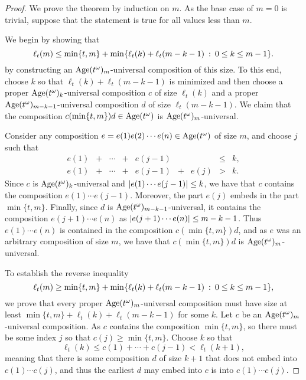\begin{proof}
	We prove the theorem by induction on $m$. As the base case of $m = 0$ is trivial, suppose that the statement is true for all values less than $m$. 
	
	We begin by showing that
	\[
		\ell_t(m) 
		\le
		\min\{t, m\} + \min\{\ell_t(k) + \ell_t(m-k-1) \::\: 0 \le k \le m-1\}.
	\]
	by constructing an $\operatorname{Age}(t^\omega)_m$-universal composition of this size. To this end, choose $k$ so that $\ell_t(k) + \ell_t(m-k-1)$ is minimized and then choose a proper $\operatorname{Age}(t^\omega)_k$-universal composition $c$ of size $\ell_t(k)$ and a proper $\operatorname{Age}(t^\omega)_{m-k-1}$-universal composition $d$ of size $\ell_t(m-k-1)$. We claim that the composition $c (\min\{t, m\}) d \in \operatorname{Age}(t^\omega)$ is $\operatorname{Age}(t^\omega)_m$-universal.

	Consider any composition $e = e(1) e(2) \cdots e(n) \in \operatorname{Age}(t^\omega)$ of size $m$, and choose $j$ such that
	\[
		\begin{array}{lccclclcl}
			e(1) &+& \cdots &+& e(j-1) & &      &\le& k,\\
			e(1) &+& \cdots &+& e(j-1) &+& e(j) & > & k.
		\end{array}
	\]
	Since $c$ is $\operatorname{Age}(t^\omega)_k$-universal and $\left\lvert{e(1) \cdots e(j-1)}\right\rvert \le k$, we have that $c$ contains the composition $e(1) \cdots e(j-1)$. Moreover, the part $e(j)$ embeds in the part $\min\{t, m\}$. Finally, since $d$ is $\operatorname{Age}(t^\omega)_{m-k-1}$-universal, it contains the composition $e(j+1) \cdots e(n)$ as $\left\lvert{e(j+1)\cdots e(n)}\right\rvert \le m-k-1$. Thus $e(1) \cdots e(n)$ is contained in the composition $c (\min\{t, m\}) d$, and as $e$ was an arbitrary composition of size $m$, we have that $c (\min\{t, m\}) d$ is $\operatorname{Age}(t^\omega)_m$-universal.

	To establish the reverse inequality
	\[
		\ell_t(m)
		\ge
		\min\{t, m\} + \min\{\ell_t(k) + \ell_t(m-k-1) \::\: 0 \le k \le m-1\},
	\]
	we prove that every proper $\operatorname{Age}(t^\omega)_m$-universal composition must have size at least $\min\{t, m\} + \ell_t(k) + \ell_t(m-k-1)$ for some $k$. Let $c$ be an $\operatorname{Age}(t^\omega)_m$-universal composition. As $c$ contains the composition $\min\{t, m\}$, so there must be some index $j$ so that $c(j) \ge \min\{t, m\}$. Choose $k$ so that
	\[
		\ell_t(k) 
		\le 
		c(1) + \cdots + c(j-1) 
		< 
		\ell_t(k+1),
	\]
	meaning that there is some composition $d$ of size $k+1$ that does not embed into $c(1) \cdots c(j)$, and thus the earliest $d$ may embed into $c$ is into $c(1) \cdots c(j)$.


\end{proof}
